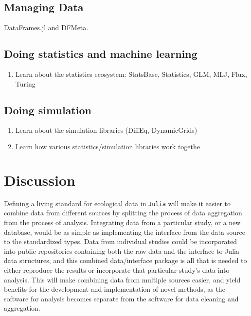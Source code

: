 \documentclass[11pt]{article}
\begin{document}
\hypertarget{managing-data}{%
\subsection{Managing Data}\label{managing-data}}

DataFrames.jl and DFMeta.

\hypertarget{doing-statistics-and-machine-learning}{%
\subsection{Doing statistics and machine
learning}\label{doing-statistics-and-machine-learning}}

\begin{enumerate}
\def\labelenumi{\arabic{enumi}.}
\setcounter{enumi}{6}
\tightlist
\item
  Learn about the statistics ecosystem: StatsBase, Statistics, GLM, MLJ,
  Flux, Turing
\end{enumerate}

\hypertarget{doing-simulation}{%
\subsection{Doing simulation}\label{doing-simulation}}

\begin{enumerate}
\def\labelenumi{\arabic{enumi}.}
\setcounter{enumi}{7}
\tightlist
\item
  Learn about the simulation libraries (DiffEq, DynamicGrids)
\item
  Learn how various statistics/simulation libraries work togethe
\end{enumerate}

\hypertarget{discussion}{%
\section{Discussion}\label{discussion}}

Defining a living standard for ecological data in \texttt{Julia} will
make it easier to combine data from different sources by splitting the
process of data aggregation from the process of analysis. Integrating
data from a particular study, or a new database, would be as simple as
implementing the interface from the data source to the standardized
types. Data from individual studies could be incorporated into public
repositories containing both the raw data and the interface to Julia
data structures, and this combined data/interface package is all that is
needed to either reproduce the results or incorporate that particular
study's data into analysis. This will make combining data from multiple
sources easier, and yield benefits for the development and
implementation of novel methods, as the software for analysis becomes
separate from the software for data cleaning and aggregation.
\end{document}
